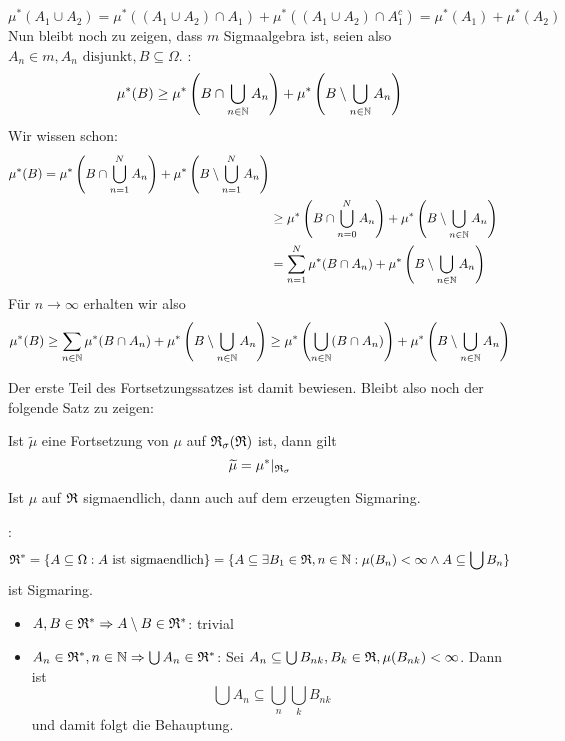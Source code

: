 \begin{bew}
				\[ \mu^*(A_1\cup A_2)=\mu^*((A_1\cup A_2)\cap A_1)+\mu^*((A_1\cup A_2)\cap A_1^c)=\mu^*(A_1)+\mu^*(A_2) \]
				\arge
				Nun bleibt noch zu zeigen, dass $m$ Sigmaalgebra ist, seien also $A_n\in m, A_n\text{ disjunkt}, B\subseteq \Omega$.\newline
				\zz:
				\[ \mu^*(B)\ge \mu^*\left(B\cap \bigcup_{n\in \mathbb{N}} A_n\right)+\mu^*\left(B\setminus \bigcup_{n\in\mathbb{N}} A_n\right) \]
				Wir wissen schon:
				\begin{align*}
				\mu^*(B)=\mu^*\left(B\cap \bigcup_{n=1}^N A_n\right)+\mu^*\left(B\setminus\bigcup_{n=1}^N A_n\right)\\
				&\ge \mu^*\left(B\cap \bigcup_{n=0}^N A_n\right)+\mu^*\left(B\setminus\bigcup_{n\in\mathbb{N}} A_n\right)\\
				&=\sum_{n=1}^N\mu^*(B\cap A_n)+\mu^*\left(B\setminus\bigcup_{n\in\mathbb{N}} A_n\right)\\
				\end{align*}
				Für $n\to\infty$ erhalten wir also
				\[ \mu^*(B)\ge \sum_{n\in\mathbb{N}} \mu^*(B\cap A_n)+\mu^*\left(B \setminus \bigcup_{n\in\mathbb{N}} A_n\right)\ge\mu^*\left(\bigcup_{n\in\mathbb{N}} (B\cap A_n)\right)+\mu^*\left(B\setminus\bigcup_{n\in\mathbb{N}} A_n\right) \]
				\arge
			\end{bew}
			
			\begin{bem}
				Der erste Teil des Fortsetzungssatzes ist damit bewiesen. Bleibt also noch der folgende Satz zu zeigen:
			\end{bem}
			
			\begin{satz}
				Ist $\widetilde{\mu}$ eine Fortsetzung von $\mu$ auf $\mathfrak{R}_\sigma(\mathfrak{R})$ ist, dann gilt 
				\[ \widetilde{\mu}=\mu^*|_{\mathfrak{R}_\sigma} \]
			\end{satz}
			
			\begin{satz}
				Ist $\mu$ auf $\mathfrak{R}$ sigmaendlich, dann auch auf dem erzeugten Sigmaring.
			\end{satz}
			
			\begin{bew}
				\zz:
				\[ \mathfrak{R}^*=\{A\subseteq \Omega: A \text{ ist sigmaendlich}\}=\{A\subseteq \exists B_1\in\mathfrak{R}, n\in\mathbb{N}: \mu(B_n)<\infty \land A\subseteq\bigcup B_n\} \]
				ist Sigmaring. \newline
				\begin{itemize}
					\item $A,B\in\mathfrak{R}^*\Rightarrow A\setminus B\in\mathfrak{R}^*$: trivial
					\item $A_n\in\mathfrak{R}^*, n\in\mathbb{N}\Rightarrow \bigcup A_n\in\mathfrak{R}^*$:\newline
					Sei $A_n\subseteq \bigcup B_{nk}, B_{k}\in\mathfrak{R}, \mu(B_{nk})<\infty$. Dann ist
					\[ \bigcup A_n\subseteq \bigcup_{n}\bigcup_k B_{nk} \]
					und damit folgt die Behauptung.
				\end{itemize}
			\end{bew}
			
